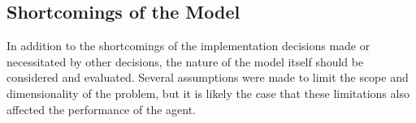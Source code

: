 
\subsection{Shortcomings of the Model}
\label{sec:disc-shortcomings}

In addition to the shortcomings of the implementation decisions made or
necessitated by other decisions,
the nature of the model itself should be considered and evaluated.
%
Several assumptions were made to limit the scope and dimensionality of the
problem,
but it is likely the case that these limitations also affected the
performance of the agent.







